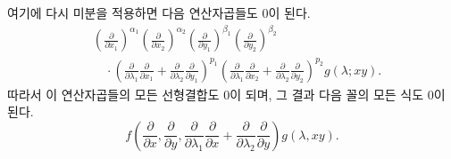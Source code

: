 
여기에 다시 미분을 적용하면 다음 연산자곱들도 0이 된다.
\[
\begin{aligned}
&\left(\frac{\partial}{\partial x_1}\right)^{\alpha_1}
 \left(\frac{\partial}{\partial x_2}\right)^{\alpha_2}
 \left(\frac{\partial}{\partial y_1}\right)^{\beta_1}
 \left(\frac{\partial}{\partial y_2}\right)^{\beta_2} \\
&\quad\cdot
 \left(\frac{\partial}{\partial\lambda_1}\frac{\partial}{\partial x_1}
 +\frac{\partial}{\partial\lambda_2}\frac{\partial}{\partial y_1}\right)^{p_1}
 \left(\frac{\partial}{\partial\lambda_1}\frac{\partial}{\partial x_2}
 +\frac{\partial}{\partial\lambda_2}\frac{\partial}{\partial y_2}\right)^{p_2}
 g(\lambda;xy).
\end{aligned}
\]
따라서 이 연산자곱들의 모든 선형결합도 0이 되며, 그 결과 다음 꼴의 모든 식도 0이 된다.
\[
  f\left(\frac{\partial}{\partial x},\frac{\partial}{\partial y},
  \frac{\partial}{\partial\lambda_1}\frac{\partial}{\partial x}
  +\frac{\partial}{\partial\lambda_2}\frac{\partial}{\partial y}\right)g(\lambda,xy).
\]
